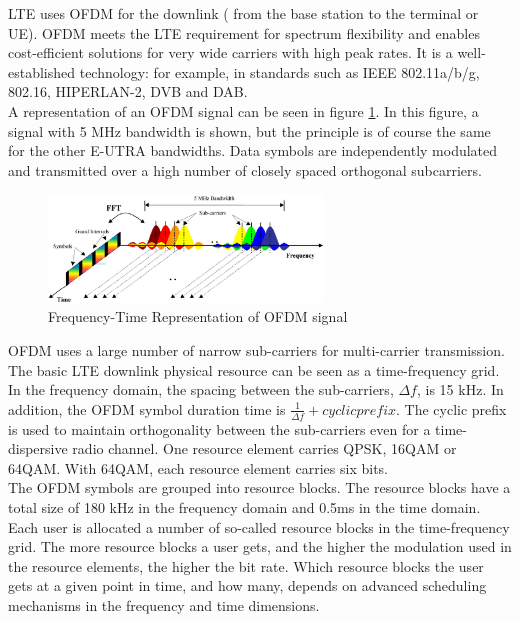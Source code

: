 LTE uses OFDM for the downlink ( from the base station to the terminal or UE).
OFDM meets the LTE requirement for spectrum flexibility and enables cost-efficient
solutions for very wide carriers with high peak rates. It is a well-established
technology: for example, in standards such as IEEE 802.11a/b/g, 802.16, HIPERLAN-2,
DVB and DAB.\cite{introlte} \cite{umtslte}\\

A representation of an OFDM signal can be seen in figure \ref{fig:ofdmfreq}. In
this figure, a signal with 5 MHz bandwidth is shown, but the principle is of
course the same for the other E-UTRA bandwidths. Data symbols are independently
modulated and transmitted over a high number of closely spaced orthogonal
subcarriers.\\

\begin{figure}[htbp]
    \centering
    \includegraphics[width=0.65\textwidth]{./figures/ofdm_frequency}
    \caption{ Frequency-Time Representation of OFDM signal
    \label{fig:ofdmfreq}}
\end{figure}

OFDM uses a large number of narrow sub-carriers for multi-carrier transmission.
The basic LTE downlink physical resource can be seen as a time-frequency grid.
In the frequency domain, the spacing between the sub-carriers, $\Delta f$, is 15
kHz. In addition, the OFDM symbol duration time is $\frac{1}{\Delta f} + cyclic prefix$.
The cyclic prefix is used to maintain orthogonality between the sub-carriers even
for a time-dispersive radio channel. One resource element carries QPSK, 16QAM or
64QAM. With 64QAM, each resource element carries six bits.\\

The OFDM symbols are grouped into resource blocks. The resource blocks have a
total size of 180 kHz in the frequency domain and 0.5ms in the time domain. Each
user is allocated a number of so-called resource blocks in the time-frequency grid.
The more resource blocks a user gets, and the higher the modulation used in the
resource elements, the higher the bit rate. Which resource blocks the user gets
at a given point in time, and how many, depends on advanced scheduling mechanisms
in the frequency and time dimensions.\\

